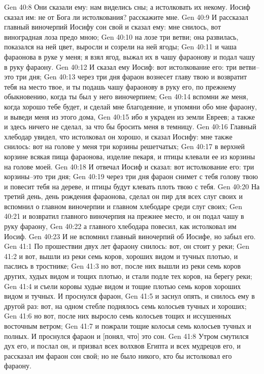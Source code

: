Gen 40:8  Они сказали ему: нам виделись сны; а истолковать их некому. Иосиф сказал им: не от Бога ли истолкования? расскажите мне.
Gen 40:9  И рассказал главный виночерпий Иосифу сон свой и сказал ему: мне снилось, вот виноградная лоза предо мною;
Gen 40:10  на лозе три ветви; она развилась, показался на ней цвет, выросли и созрели на ней ягоды;
Gen 40:11  и чаша фараонова в руке у меня; я взял ягод, выжал их в чашу фараонову и подал чашу в руку фараону.
Gen 40:12  И сказал ему Иосиф: вот истолкование его: три ветви--это три дня;
Gen 40:13  через три дня фараон вознесет главу твою и возвратит тебя на место твое, и ты подашь чашу фараонову в руку его, по прежнему обыкновению, когда ты был у него виночерпием;
Gen 40:14  вспомни же меня, когда хорошо тебе будет, и сделай мне благодеяние, и упомяни обо мне фараону, и выведи меня из этого дома,
Gen 40:15  ибо я украден из земли Евреев; а также и здесь ничего не сделал, за что бы бросить меня в темницу.
Gen 40:16  Главный хлебодар увидел, что истолковал он хорошо, и сказал Иосифу: мне также снилось: вот на голове у меня три корзины решетчатых;
Gen 40:17  в верхней корзине всякая пища фараонова, изделие пекаря, и птицы клевали ее из корзины на голове моей.
Gen 40:18  И отвечал Иосиф и сказал: вот истолкование его: три корзины--это три дня;
Gen 40:19  через три дня фараон снимет с тебя голову твою и повесит тебя на дереве, и птицы будут клевать плоть твою с тебя.
Gen 40:20  На третий день, день рождения фараонова, сделал он пир для всех слуг своих и вспомнил о главном виночерпии и главном хлебодаре среди слуг своих;
Gen 40:21  и возвратил главного виночерпия на прежнее место, и он подал чашу в руку фараону,
Gen 40:22  а главного хлебодара повесил, как истолковал им Иосиф.
Gen 40:23  И не вспомнил главный виночерпий об Иосифе, но забыл его.
Gen 41:1  По прошествии двух лет фараону снилось: вот, он стоит у реки;
Gen 41:2  и вот, вышли из реки семь коров, хороших видом и тучных плотью, и паслись в тростнике;
Gen 41:3  но вот, после них вышли из реки семь коров других, худых видом и тощих плотью, и стали подле тех коров, на берегу реки;
Gen 41:4  и съели коровы худые видом и тощие плотью семь коров хороших видом и тучных. И проснулся фараон,
Gen 41:5  и заснул опять, и снилось ему в другой раз: вот, на одном стебле поднялось семь колосьев тучных и хороших;
Gen 41:6  но вот, после них выросло семь колосьев тощих и иссушенных восточным ветром;
Gen 41:7  и пожрали тощие колосья семь колосьев тучных и полных. И проснулся фараон и [понял, что] это сон.
Gen 41:8  Утром смутился дух его, и послал он, и призвал всех волхвов Египта и всех мудрецов его, и рассказал им фараон сон свой; но не было никого, кто бы истолковал его фараону.
